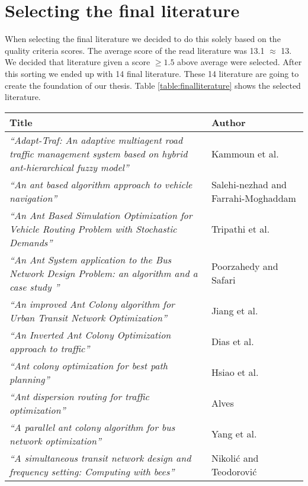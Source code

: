 \section{Selecting the final literature}
When selecting the final literature we decided to do this solely based on the quality criteria scores. The average score of the read literature was 13.1 $\approx$ 13. We decided that literature given a score $\geq{1.5}$ above average were selected. After this sorting we ended up with 14 final literature. These 14 literature are going to create the foundation of our thesis. Table \ref{table:finalliterature} shows the selected literature. 

\begin{table}[!htb]
    {
    \begin{center}
    \small
    \begin{tabular}[c]{| m{7cm} | m{7cm} |}
        \hline
        \textbf{Title} & \textbf{Author} \\ \hline
        \textit{``Adapt-Traf: An adaptive multiagent road traffic management system based on hybrid ant-hierarchical fuzzy model''} & Kammoun et al. \\ \hline
        \textit{``An ant based algorithm approach to vehicle navigation''} & Salehi-nezhad and Farrahi-Moghaddam \\ \hline
        \textit{``An Ant Based Simulation Optimization for Vehicle Routing Problem with Stochastic Demands''} & Tripathi et al. \\ \hline
        \textit{``An Ant System application to the Bus Network Design Problem: an algorithm and a case study ''} & Poorzahedy and Safari \\ \hline
        \textit{``An improved Ant Colony algorithm for Urban Transit Network Optimization''} & Jiang et al. \\ \hline
        \textit{``An Inverted Ant Colony Optimization approach to traffic''} & Dias et al. \\ \hline
        \textit{``Ant colony optimization for best path planning''} & Hsiao et al. \\ \hline
        \textit{``Ant dispersion routing for traffic optimization''} & Alves \\ \hline
        \textit{``A parallel ant colony algorithm for bus network optimization''} & Yang et al. \\ \hline
        \textit{``A simultaneous transit network design and frequency setting: Computing with bees''} & Nikolić and Teodorović \\ \hline

\end{tabular}
\end{center}}
\end{table}
